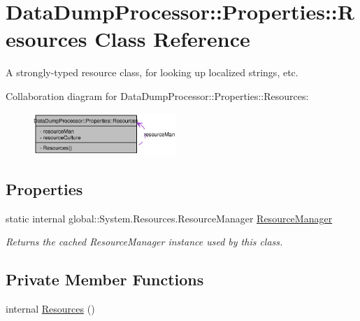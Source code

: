 \hypertarget{class_data_dump_processor_1_1_properties_1_1_resources}{
\section{Data\-Dump\-Processor::Properties::Resources Class Reference}
\label{class_data_dump_processor_1_1_properties_1_1_resources}
}
A strongly-typed resource class, for looking up localized strings, etc.  


Collaboration diagram for Data\-Dump\-Processor::Properties::Resources:\begin{figure}[H]
\begin{center}
\leavevmode
\includegraphics[width=152pt]{class_data_dump_processor_1_1_properties_1_1_resources__coll__graph}
\end{center}
\end{figure}
\subsection*{Properties}
\begin{CompactItemize}
\item 
\hypertarget{class_data_dump_processor_1_1_properties_1_1_resources_4f0c5da7938428524631751fedd836e3}{
static internal global::System.Resources.Resource\-Manager \hyperlink{class_data_dump_processor_1_1_properties_1_1_resources_4f0c5da7938428524631751fedd836e3}{Resource\-Manager}}
\label{class_data_dump_processor_1_1_properties_1_1_resources_4f0c5da7938428524631751fedd836e3}

\begin{CompactList}\small\item\em Returns the cached Resource\-Manager instance used by this class. \item\end{CompactList}\end{CompactItemize}
\subsection*{Private Member Functions}
\begin{CompactItemize}
\item 
\hypertarget{class_data_dump_processor_1_1_properties_1_1_resources_89054ef940d2bc8df28211854c02179c}{
internal \hyperlink{class_data_dump_processor_1_1_properties_1_1_resources_89054ef940d2bc8df28211854c02179c}{Resources} ()}
\label{class_data_dump_processor_1_1_properties_1_1_resources_89054ef940d2bc8df28211854c02179c}

\end{CompactItemize}

